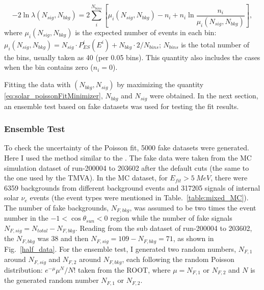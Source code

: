 \begin{equation}\label{eq:solar_poissonFitMinimizer}
-2\ln\mathcal \lambda(N_{sig},N_{bkg})
=2\sum_i^{N_{bins}}[\mu_i(N_{sig},N_{bkg})-n_i+n_i\ln\frac{n_i}{\mu_i(N_{sig},N_{bkg})}],
\end{equation}
where $\mu_i(N_{sig},N_{bkg})$ is the expected number of events in each bin: $\mu_i(N_{sig},N_{bkg})=N_{sig}\cdot P^i_{ES}(E^i)+N_{bkg}\cdot2/N_{bins}$; $N_{bins}$ is the total number of the bins, usually taken as 40 (per 0.05 bins). This quantity also includes the cases when the bin contains zero ($n_i=0$).

Fitting the data with $(N_{bkg},N_{sig})$ by maximizing the quantity \ref{eq:solar_poissonFitMinimizer}, $N_{bkg}$ and $N_{sig}$ were obtained. In the next section, an ensemble test based on fake datasets was used for testing the fit results.
%
%
\subsubsection{Ensemble Test}
To check the uncertainty of the Poisson fit, 5000 fake datasets were generated. Here I used the method similar to the \cite{leta}.
The fake data were taken from the MC simulation dataset of run-200004 to 203602 after the default cuts (the same to the one used by the TMVA). In the MC dataset, for $E_{fit}>5~MeV$, there were 6359 backgrounds from different background events and 317205 signals of internal solar $\nu_e$ events (the event types were mentioned in Table.~\ref{table:mixed_MC}).
The number of fake backgrounds, $N_{F,bkg}$, was assumed to be two times the event number in the $-1<\cos\theta_{sun}<0$ region while the number of fake signals $N_{F,sig}=N_{total}-N_{F,bkg}$. Reading from the sub dataset of run-200004 to 203602, the $N_{F,bkg}$ was 38 and then $N_{F,sig}=109-N_{F,bkg}=71$, as shown in Fig.~\ref{half_data}. For the ensemble test, I generated  
two random numbers, $N_{F,1}$ around $N_{F,sig}$ and $N_{F,2}$ around $N_{F,bkg}$, each following the random Poisson distribution: $e^{-\mu}\mu^N/N!$ taken from the ROOT, where $\mu=N_{F,1}$ or $N_{F,2}$ and $N$ is the generated random number $N_{F,1}$ or $N_{F,2}$. 

